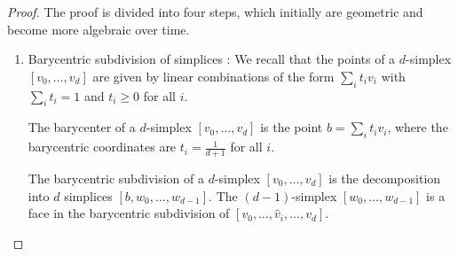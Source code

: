 \begin{proof}{\textit{\cite[Proof of Proposition 2.21]{hatcher2005algebraic}}} The proof is divided into four steps, which initially are geometric and become more algebraic over time.
	
	\begin{enumerate}
	\item Barycentric subdivision of simplices \cite[Proposition 2.21 (1)]{hatcher2005algebraic}: We recall that the points of a $d$-simplex $[v_0, \ldots, v_d]$ are given by linear combinations of the form $\sum_{i} t_i v_i$ with $\sum_i t_i = 1$ and $t_i \geq 0$ for all $i$.
			
	\begin{definition}[Barycenter]
		The barycenter of a $d$-simplex $[v_0, \ldots, v_d]$ is the point $b = \sum_i t_i v_i$, where the barycentric coordinates are $t_i = \frac{1}{d+1}$ for all $i$.
	\end{definition}
			
	\begin{definition}
		The barycentric subdivision of a $d$-simplex $[v_0, \ldots, v_d]$ is the decomposition into $d$ simplices $[b, w_0, \ldots, w_{d-1}]$. The $(d-1)$-simplex $[w_0, \ldots, w_{d-1}]$ is a face in the barycentric subdivision of $[v_0, \ldots, \hat{v}_i, \ldots, v_d]$.
	\end{definition}
			

\end{enumerate}
\end{proof}
